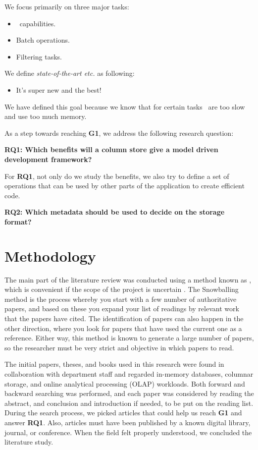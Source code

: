 We focus primarily on three major tasks:
\begin{itemize}
    \item \bd~capabilities.
    \item Batch operations.
    \item Filtering tasks.
\end{itemize}

We define \textit{state-of-the-art etc.} as following:
\begin{itemize}
    \item It's super new and the best!
\end{itemize}

We have defined this goal because we know that for certain tasks \gap~are too slow and use too much memory.

As a step towards reaching \textbf{G1}, we address the following research question:

\textbf{RQ1: Which benefits will a column store give a model driven development framework?} 

For \textbf{RQ1}, not only do we study the benefits, we also try to define a set of operations that can be used by other parts of the application to create efficient code.

\textbf{RQ2: Which metadata should be used to decide on the storage format?} 

\section{Methodology}
\label{sec:Methodology}
The main part of the literature review was conducted using a method known as , which is convenient if the scope of the project is uncertain \cite{Ang2014-nm}. The Snowballing method is the process whereby you start with a few number of authoritative papers, and based on these you expand your list of readings by relevant work that the papers have cited. The identification of papers can also happen in the other direction, where you look for papers that have used the current one as a reference. Either way, this method is known to generate a large number of papers, so the researcher must be very strict and objective in which papers to read.

The initial papers, theses, and books used in this research were found in collaboration with department staff and regarded in-memory databases, columnar storage, and online analytical processing (OLAP) workloads. Both forward and backward searching was performed, and each paper was considered by reading the abstract, and conclusion and introduction if needed, to be put on the reading list. During the search process, we picked articles that could help us reach \textbf{G1} and answer \textbf{RQ1}. Also, articles must have been published by a known digital library, journal, or conference. When the field felt properly understood, we concluded the  literature study.


